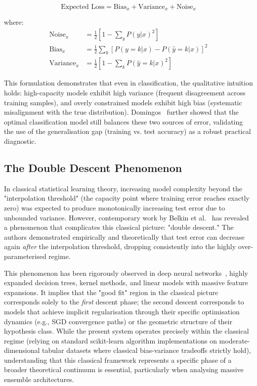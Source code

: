 \documentclass[conference]{IEEEtran}
\begin{document}
\begin{equation}
\text{Expected Loss} = \text{Bias}_x + \text{Variance}_x + \text{Noise}_x
\end{equation}

where:
\begin{align}
\text{Noise}_x &= \frac{1}{2} \left[ 1 - \sum_y P(y|x)^2 \right] \\
\text{Bias}_x &= \frac{1}{2} \sum_k \left[ P(y=k|x) - P(\hat{y}=k|x) \right]^2 \\
\text{Variance}_x &= \frac{1}{2} \left[ 1 - \sum_k P(\hat{y}=k|x)^2 \right]
\end{align}

This formulation demonstrates that even in classification, the qualitative intuition holds: high-capacity models exhibit high variance (frequent disagreement across training samples), and overly constrained models exhibit high bias (systematic misalignment with the true distribution). Domingos~\cite{b19} further showed that the optimal classification model still balances these two sources of error, validating the use of the generalisation gap (training vs. test accuracy) as a robust practical diagnostic.

\subsection{The Double Descent Phenomenon}

In classical statistical learning theory, increasing model complexity beyond the "interpolation threshold" (the capacity point where training error reaches exactly zero) was expected to produce monotonically increasing test error due to unbounded variance. However, contemporary work by Belkin et al.~\cite{b21} has revealed a phenomenon that complicates this classical picture: "double descent." The authors demonstrated empirically and theoretically that test error can decrease again \textit{after} the interpolation threshold, dropping consistently into the highly over-parameterised regime.

This phenomenon has been rigorously observed in deep neural networks~\cite{b23, b26}, highly expanded decision trees, kernel methods, and linear models with massive feature expansions. It implies that the "good fit" region in the classical picture corresponds solely to the \textit{first} descent phase; the second descent corresponds to models that achieve implicit regularisation through their specific optimisation dynamics (e.g., SGD convergence paths) or the geometric structure of their hypothesis class. While the present system operates precisely within the classical regime (relying on standard scikit-learn algorithm implementations on moderate-dimensional tabular datasets where classical bias-variance tradeoffs strictly hold), understanding that this classical framework represents a specific phase of a broader theoretical continuum is essential, particularly when analysing massive ensemble architectures.
\end{document}
